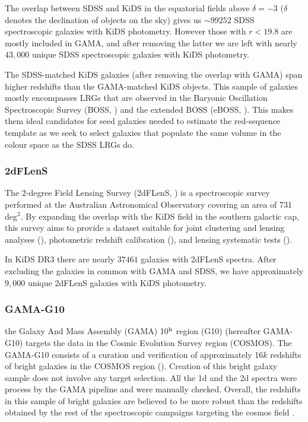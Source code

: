 \documentclass[fleqn,usenatbib,useAMS]{mnras}
\begin{document}
The overlap between SDSS and KiDS in the equatorial fields above $\delta =-3$ ($\delta$ denotes the declination of objects on the sky) gives us $\sim 99252$ SDSS spectroscopic galaxies with KiDS photometry. However those with $r<19.8$ are mostly included in GAMA, and after removing the latter we are left with nearly $43,000$ unique SDSS spectroscopic galaxies with KiDS photometry. 

The SDSS-matched KiDS galaxies (after removing the overlap with GAMA) span higher redshifts than the GAMA-matched KiDS objects. This sample of galaxies mostly encompasses LRGs that are observed in the Baryonic Oscillation Spectroscopic Survey (BOSS, \citealt{dawson2013}) and the extended BOSS (eBOSS, \citealt{dawson2016}). This makes them ideal candidates for seed galaxies needed to estimate the red-sequence template as we seek to select galaxies that populate the same volume in the colour space as the SDSS LRGs do. 

\subsubsection{2dFLenS}
The 2-degree Field Lensing Survey (2dFLenS, \citealt{blake2016}) is a spectroscopic survey performed at the Australian Astronomical Observatory covering an area of 731 deg$^2$. By expanding the overlap with the KiDS field in the southern galactic cap, this survey aims to provide a dataset suitable for joint clustering and lensing analyses (\citealt{amon2018b,joudaki2018}), photometric redshift calibration (\citealt{johnson2017,wolf2017,kids_annz}), and lensing systematic tests (\citealt{amon2018a}).

In KiDS DR3 there are nearly $37461$ galaxies with 2dFLenS spectra. After excluding the galaxies in common with GAMA and SDSS, we have approximately $9,000$ unique 2dFLenS galaxies with KiDS photometry.

\subsubsection{GAMA-G10}

the Galaxy And Mass Assembly (GAMA) 10$^{\rm h}$ region (G10) (hereafter GAMA-G10) targets the data in the Cosmic Evolution Survey region (COSMOS). The GAMA-G10 consists of a curation and verification of approximately 16$k$ redshifts of bright galaxies in the COSMOS region (\citealt{davis2017}). Creation of this bright galaxy sample does not involve any target selection. All the 1d and the 2d spectra were process by the GAMA pipeline and were manually checked. Overall, the redshifts in this sample of bright galaxies are believed to be more robust than the redshifts obtained by the rest of the spectroscopic campaigns targeting the cosmos field \citep[e.g.][]{lily2009}.
\end{document}
